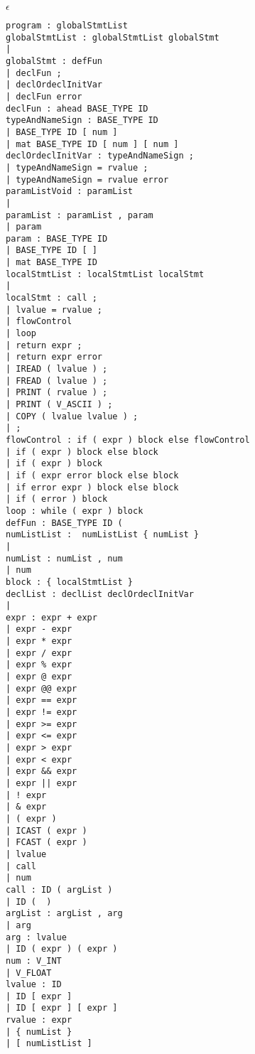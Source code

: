$\epsilon$
\begin{lstlisting}[texcl=true]
program : globalStmtList 
globalStmtList : globalStmtList globalStmt
| 
globalStmt : defFun 
| declFun ; 
| declOrdeclInitVar
| declFun error
declFun : ahead BASE_TYPE ID 
typeAndNameSign : BASE_TYPE ID 
| BASE_TYPE ID [ num ] 
| mat BASE_TYPE ID [ num ] [ num ] 
declOrdeclInitVar : typeAndNameSign ;
| typeAndNameSign = rvalue ; 
| typeAndNameSign = rvalue error
paramListVoid : paramList 
| 
paramList : paramList , param 
| param 
param : BASE_TYPE ID 
| BASE_TYPE ID [ ] 
| mat BASE_TYPE ID 
localStmtList : localStmtList localStmt 
| 
localStmt : call ; 
| lvalue = rvalue ;  
| flowControl 
| loop 
| return expr ; 
| return expr error
| IREAD ( lvalue ) ; 
| FREAD ( lvalue ) ; 
| PRINT ( rvalue ) ; 
| PRINT ( V_ASCII ) ; 
| COPY ( lvalue lvalue ) ; 
| ; 
flowControl : if ( expr ) block else flowControl 
| if ( expr ) block else block 
| if ( expr ) block 
| if ( expr error block else block 
| if error expr ) block else block 
| if ( error ) block 
loop : while ( expr ) block 
defFun : BASE_TYPE ID (
numListList :  numListList { numList } 
| 
numList : numList , num 
| num 
block : { localStmtList } 
declList : declList declOrdeclInitVar 
| 
expr : expr + expr 
| expr - expr 
| expr * expr 
| expr / expr 
| expr % expr 
| expr @ expr 
| expr @@ expr 
| expr == expr 
| expr != expr 
| expr >= expr 
| expr <= expr 
| expr > expr 
| expr < expr 
| expr && expr 
| expr || expr 
| ! expr 
| & expr 
| ( expr ) 
| ICAST ( expr ) 
| FCAST ( expr ) 
| lvalue
| call 
| num 
call : ID ( argList ) 
| ID (  ) 
argList : argList , arg 
| arg 
arg : lvalue 
| ID ( expr ) ( expr ) 
num : V_INT 
| V_FLOAT 
lvalue : ID 
| ID [ expr ] 
| ID [ expr ] [ expr ] 
rvalue : expr
| { numList } 
| [ numListList ]

\end{lstlisting}